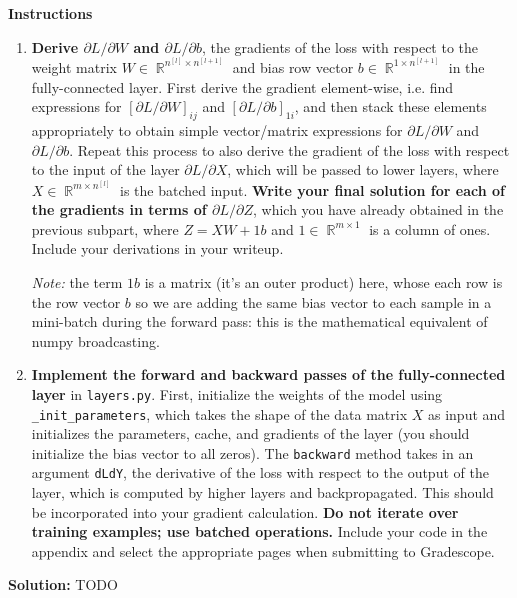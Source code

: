 \documentclass{article}
\DeclareMathOperator{\R}{\mathbb{R}}
\newenvironment{solution}{\color{blue} \smallskip \textbf{Solution:}}{}
\begin{document}
\textbf{Instructions}
\begin{enumerate}
    \item 
    \textbf{Derive $\partial L/\partial W$ and $\partial L/\partial b$}, the gradients of the loss with respect to the weight matrix $W \in \R^{n^{[l]} \times n^{[l+1]}}$ and bias row vector $b \in \R^{1 \times n^{[l+1]}}$ in the fully-connected layer. 
    First derive the gradient element-wise, i.e. find expressions for $\left[\partial L/\partial W\right]_{ij}$ and $\left[\partial L/\partial b\right]_{1i}$, and then stack these elements appropriately to obtain simple vector/matrix expressions for $\partial L/\partial W$ and $\partial L/\partial b$. 
    Repeat this process to also derive the gradient of the loss with respect to the input of the layer $\partial L/\partial X$, which will be passed to lower layers, where $X \in \R^{m \times n^{[l]}}$ is the batched input. 
    \textbf{Write your final solution for each of the gradients in terms of $\partial L/\partial Z$}, which you have already obtained in the previous subpart, where $Z = XW+1b$ and $1 \in \R^{m \times 1}$ is a column of ones. 
    Include your derivations in your writeup.
    
    \textit{Note:} the term $1b$ is a matrix (it's an outer product) here, whose each row is the row vector $b$ so we are adding the same bias vector to each sample in a mini-batch during the forward pass: this is the mathematical equivalent of numpy broadcasting.
    
    \item 
    \textbf{Implement the forward and backward passes of the fully-connected layer} in \texttt{layers.py}. 
    First, initialize the weights of the model using \texttt{\_init\_parameters}, which takes the shape of the data matrix $X$ as input and initializes the parameters, cache, and gradients of the layer (you should initialize the bias vector to all zeros). 
    The \texttt{backward} method takes in an argument \texttt{dLdY}, the derivative of the loss with respect to the output of the layer, which is computed by higher layers and backpropagated. 
    This should be incorporated into your gradient calculation. 
    \textbf{Do not iterate over training examples; use batched operations.} 
    Include your code in the appendix and select the appropriate pages when submitting to Gradescope.
\end{enumerate}

\begin{solution}
    TODO
\end{solution}
\end{document}
